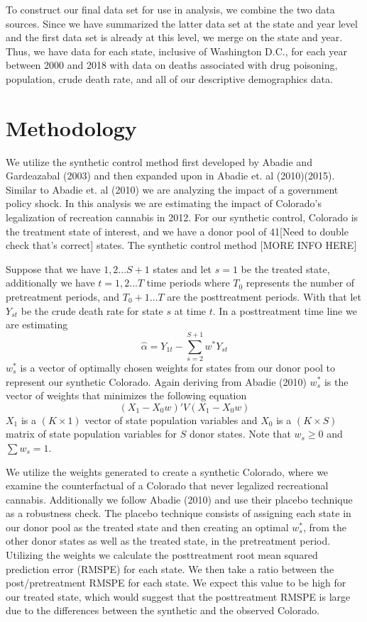 \documentclass{article}
\begin{document}
To construct our final data set for use in analysis, we combine the two data sources. Since we have summarized the latter data set at the state and year level and the first data set is already at this level, we merge on the state and year. Thus, we have data for each state, inclusive of Washington D.C., for each year between 2000 and 2018 with data on deaths associated with drug poisoning, population, crude death rate, and all of our descriptive demographics data.



\section{Methodology}

We utilize the synthetic control method first developed by Abadie and Gardeazabal (2003) and then expanded upon in Abadie et. al (2010)(2015). Similar to Abadie et. al (2010) we are analyzing the impact of a government policy shock. In this analysis we are estimating the impact of Colorado's legalization of recreation cannabis in 2012. For our synthetic control, Colorado is the treatment state of interest, and we have a donor pool of 41[Need to double check that's correct] states. The synthetic control method [MORE INFO HERE]

Suppose that we have $1,2...S+1$ states and let $s = 1$ be the treated state, additionally we have $t = 1,2...T$ time periods where $T_0$ represents the number of pretreatment periods, and $T_0 + 1...T$ are the posttreatment periods. With that let $Y_{st}$ be the crude death rate for state $s$ at time $t$. In a posttreatment time line we are estimating
\begin{equation*}
\hat{\alpha} = Y_{1t} - \sum_{s=2}^{S+1}w^{*}Y_{st}
\end{equation*}
$w^{*}_s$ is a vector of optimally chosen weights for states from our donor pool to represent our synthetic Colorado. Again deriving from Abadie (2010) $w^{*}_s$ is the vector of weights that minimizes the following equation
\begin{equation*}
(X_1 - X_0w)'V(X_1 - X_0w)
\end{equation*}
$X_1$ is a $(K \times 1)$ vector of state population variables and $X_0$ is a $(K \times S)$ matrix of state population variables for $S$ donor states. Note that $w_s \geq 0$ and $\sum w_s = 1$.

We utilize the weights generated to create a synthetic Colorado, where we examine the counterfactual of a Colorado that never legalized recreational cannabis. Additionally we follow Abadie (2010) and use their placebo technique as a robustness check. The placebo technique consists of assigning each state in our donor pool as the treated state and then creating an optimal $w^{*}_s$, from the other donor states as well as the treated state, in the pretreatment period. Utilizing the weights we calculate the posttreatment root mean squared prediction error (RMSPE) for each state. We then take a ratio between the post/pretreatment RMSPE for each state. We expect this value to be high for our treated state, which would suggest that the posttreatment RMSPE is large due to the differences between the synthetic and the observed Colorado.
\end{document}
